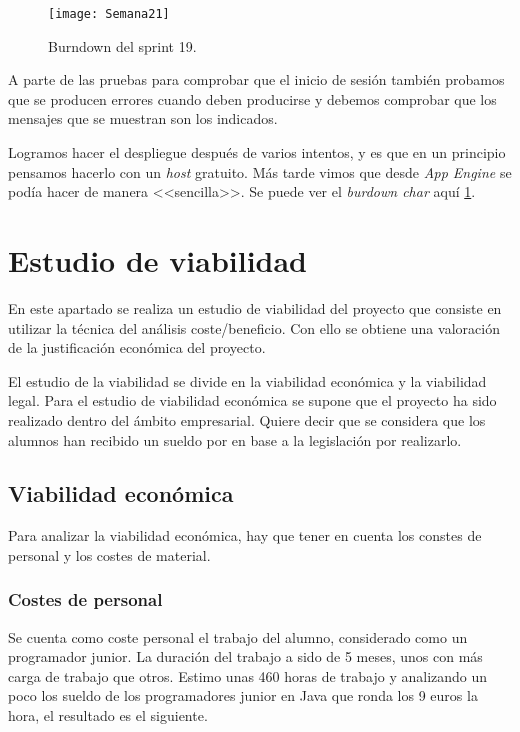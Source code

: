 \begin{figure}[h]
\centering
\texttt{[image: Semana21]}
\caption{Burndown del sprint 19.}
\label{fig:A.18}
\end{figure}

A parte de las pruebas para comprobar que el inicio de sesión también probamos que se producen errores cuando deben producirse y debemos comprobar que los mensajes que se muestran son los indicados.

Logramos hacer el despliegue después de varios intentos, y es que en un principio pensamos hacerlo con un \emph{host} gratuito. Más tarde vimos que desde \emph{App Engine} se podía hacer de manera <<sencilla>>. Se puede ver el \emph{burdown char} aquí \ref{fig:A.18}.

\section{Estudio de viabilidad}

En este apartado se realiza un estudio de viabilidad del proyecto que consiste en utilizar la
técnica del análisis coste/beneficio. Con ello se obtiene una valoración de la justificación económica del proyecto.

El estudio de la viabilidad se divide en la
viabilidad económica y la viabilidad legal.
Para el estudio de viabilidad económica se supone que el proyecto ha sido realizado
dentro del ámbito empresarial. Quiere decir que se considera que los alumnos han recibido un sueldo por en base a la legislación por realizarlo.


\subsection{Viabilidad económica}

Para analizar la viabilidad económica, hay que tener en cuenta los constes de personal y los costes de material.

\subsubsection{Costes de personal}

Se cuenta como coste personal el trabajo del alumno, considerado como un programador junior. La duración del trabajo a sido de 5 meses, unos con más carga de trabajo que otros. Estimo unas 460 horas de trabajo y analizando un poco los sueldo de los programadores junior en Java que ronda los 9 euros la hora, el resultado es el siguiente.

